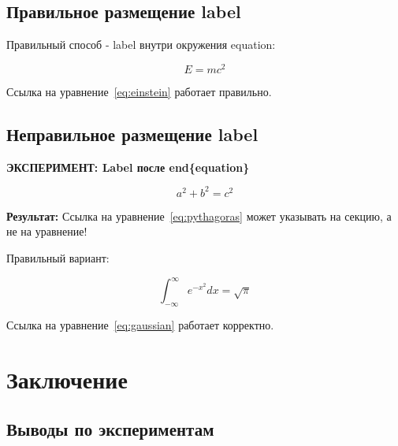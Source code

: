\documentclass[12pt]{article}
\begin{document}
\subsection{Правильное размещение label}
\label{subsec:correcteq}

Правильный способ - label внутри окружения equation:

\begin{equation}
    E = mc^2
    \label{eq:einstein}
\end{equation}

Ссылка на уравнение~\ref{eq:einstein} работает правильно.

\subsection{Неправильное размещение label}
\label{subsec:wrongeq}

\textbf{ЭКСПЕРИМЕНТ: Label после end\{equation\}}

\begin{equation}
    a^2 + b^2 = c^2
\end{equation}
\label{eq:pythagoras} %

\textbf{Результат:} Ссылка на уравнение~\ref{eq:pythagoras} может указывать на секцию, а не на уравнение!

Правильный вариант:

\begin{equation}
    \int_{-\infty}^{\infty} e^{-x^2} dx = \sqrt{\pi}
    \label{eq:gaussian}
\end{equation}

Ссылка на уравнение~\ref{eq:gaussian} работает корректно.

\lipsum[16]

\section{Заключение}
\label{sec:conclusion}

\subsection{Выводы по экспериментам}
\label{subsec:findings}
\end{document}
